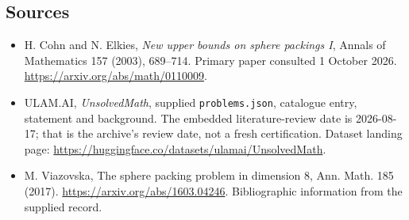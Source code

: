 \documentclass[11pt,a4paper]{article}
\begin{document}
\subsection{Sources}

{\small

\begin{itemize}
\item[E1] H. Cohn and N. Elkies, \emph{New upper bounds on sphere packings I}, Annals of Mathematics 157 (2003), 689--714. Primary paper consulted 1 October 2026. \url{https://arxiv.org/abs/math/0110009}.


\item[\hypertarget{source:statement:1}{S1}] ULAM.AI, \emph{UnsolvedMath}, supplied \texttt{problems.json}, catalogue entry, statement and background. The embedded literature-review date is 2026-08-17; that is the archive’s review date, not a fresh certification. Dataset landing page: \url{https://huggingface.co/datasets/ulamai/UnsolvedMath}.

\item[\hypertarget{source:statement:2}{S2}] M. Viazovska, The sphere packing problem in dimension 8, Ann. Math. 185 (2017). \url{https://arxiv.org/abs/1603.04246}. Bibliographic information from the supplied record.

\end{itemize}

}

\label{end:statement}
\end{document}
